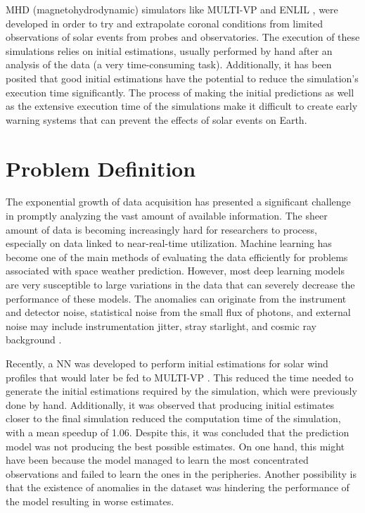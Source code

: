 MHD (magnetohydrodynamic) simulators like MULTI-VP \cite{pinto.rouillard_MultipleFluxtubeSolar_2017} and ENLIL \cite{odstrcil.pizzo_ThreedimensionalPropagationCoronal_1999}, were developed in order to try and extrapolate coronal conditions from limited observations of solar events from probes and observatories. The execution of these simulations relies on initial estimations, usually performed by hand after an analysis of the data (a very time-consuming task). Additionally, it has been posited that good initial estimations have the potential to reduce the simulation's execution time significantly. The process of making the initial predictions as well as the extensive execution time of the simulations make it difficult to create early warning systems that can prevent the effects of solar events on Earth.

\section{Problem Definition} \label{sec:prob_definition}
The exponential growth of data acquisition has presented a significant challenge in promptly analyzing the vast amount of available information. The sheer amount of data is becoming increasingly hard for researchers to process, especially on data linked to near-real-time utilization. Machine learning has become one of the main methods of evaluating the data efficiently for problems associated with space weather prediction. However, most deep learning models are very susceptible to large variations in the data that can severely decrease the performance of these models. The anomalies can originate from the instrument and detector noise, statistical noise from the small flux of photons, and external noise may include instrumentation jitter, stray starlight, and cosmic ray background \cite{anirudh2022ReviewDataDriven2022}.

Recently, a NN \cite{barros_InitialConditionEstimation_} was developed to perform initial estimations for solar wind profiles that would later be fed to MULTI-VP \cite{pinto.rouillard_MultipleFluxtubeSolar_2017}. This reduced the time needed to generate the initial estimations required by the simulation, which were previously done by hand. Additionally, it was observed that producing initial estimates closer to the final simulation reduced the computation time of the simulation, with a mean speedup of 1.06. Despite this, it was concluded that the prediction model was not producing the best possible estimates. On one hand, this might have been because the model managed to learn the most concentrated observations and failed to learn the ones in the peripheries. Another possibility is that the existence of anomalies in the dataset was hindering the performance of the model resulting in worse estimates.

